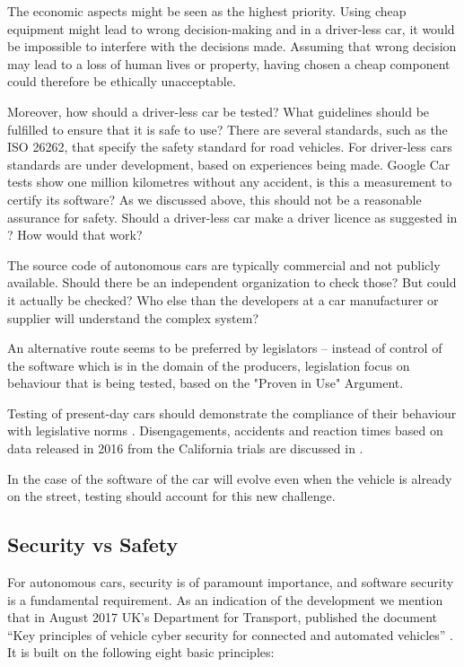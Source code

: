 The economic aspects might be seen as the highest priority. Using cheap equipment might lead to wrong decision-making and in a driver-less car, it would be impossible to interfere with the decisions made. Assuming that wrong decision may lead to a loss of human lives or property, having chosen a cheap component could therefore be ethically unacceptable.

Moreover, how should a driver-less car be tested? What guidelines should be fulfilled to ensure that it is safe to use? There are several standards, such as the ISO 26262, that specify the safety standard for road vehicles. For driver-less cars standards are under development, based on experiences being made. 
Google Car tests show one million kilometres without any accident, is this a measurement to certify its software? As we discussed above, this should not be a reasonable assurance for safety. Should a driver-less car make a driver licence as suggested in \cite{McBride:2016:EDC:2874239.2874265}? How would that work? 

The source code of autonomous cars are typically commercial and not publicly available. Should there be an independent organization to check those? But could it actually be checked? Who else than the developers at a car manufacturer or supplier will understand the complex system? 

An alternative route seems to be preferred by legislators – instead of control of the software which is in the domain of the producers, legislation focus on behaviour that is being tested, based on the "Proven in Use" Argument. %

Testing of present-day cars should demonstrate the compliance of their behaviour with legislative norms \cite{DepartmentofMotorVehiclesStateofCalifornia}. Disengagements, accidents and reaction times based on data released in 2016 from the California trials are discussed in \cite{10.1371/journal.pone.0168054}.

In the case of the software of the car will evolve even when the vehicle is already on the street, testing should account for this new challenge.



\subsection{Security vs Safety}
\label{sec:EAofTC:SecurityVSSafety}

For autonomous cars, security is of paramount importance, and software security is a fundamental requirement. As an indication of the development we mention that in August 2017 UK's Department for Transport, published the document \enquote{Key principles of vehicle cyber security for connected and automated vehicles} \cite{DepartmentforTransportDfT2017}. It is built on the following eight basic principles:

